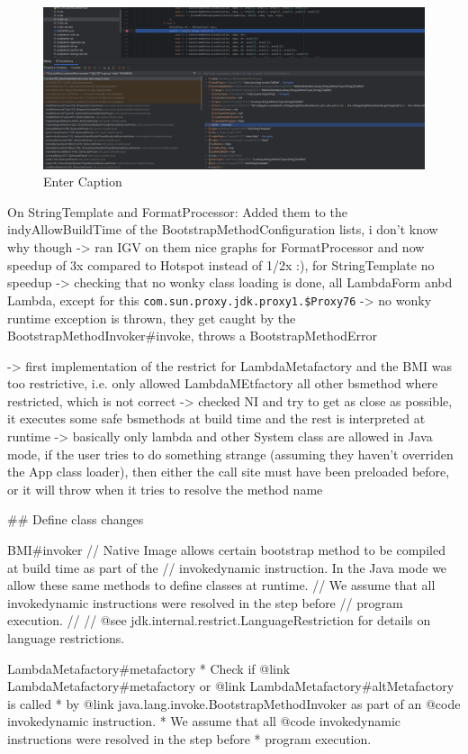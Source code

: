 \begin{figure}
    \centering
    \includegraphics[width=0.5\linewidth]{resources/Screenshot from 2024-01-31 15-20-43.png}
    \caption{Enter Caption}
    \label{fig:enter-label}
\end{figure}

On StringTemplate and FormatProcessor: Added them to the indyAllowBuildTime of the BootstrapMethodConfiguration lists, i don't know why though
-> ran IGV on them nice graphs for FormatProcessor and now speedup of 3x compared to Hotspot instead of 1/2x :), for StringTemplate no speedup
-> checking that no wonky class loading is done, all LambdaForm anbd Lambda, except for this \verb|com.sun.proxy.jdk.proxy1.$Proxy76|
-> no wonky runtime exception is thrown, they get caught by the BootstrapMethodInvoker#invoke, throws a BootstrapMethodError

-> first implementation of the restrict for LambdaMetafactory and the BMI was too restrictive, i.e. only allowed LambdaMEtfactory all other bsmethod where restricted, which is not correct
-> checked NI and try to get as close as possible, it executes some safe bsmethods at build time and the rest is interpreted at runtime
-> basically only lambda and other System class are allowed in Java mode, if the user tries to do something strange (assuming they haven't overriden the App class loader), then either the call site must have been 
preloaded before, or it will throw when it tries to resolve the method name



## Define class changes

BMI#invoker
// Native Image allows certain bootstrap method to be compiled at build time as part of the
// invokedynamic instruction. In the Java mode we allow these same methods to define classes at runtime.
// We assume that all invokedynamic instructions were resolved in the step before
// program execution.
//
// @see jdk.internal.restrict.LanguageRestriction for details on language restrictions.

LambdaMetafactory#metafactory
     * Check if {@link LambdaMetafactory#metafactory} or {@link LambdaMetafactory#altMetafactory} is called
     * by {@link java.lang.invoke.BootstrapMethodInvoker} as part of an {@code invokedynamic} instruction.
     * We assume that all {@code invokedynamic} instructions were resolved in the step before
     * program execution.

